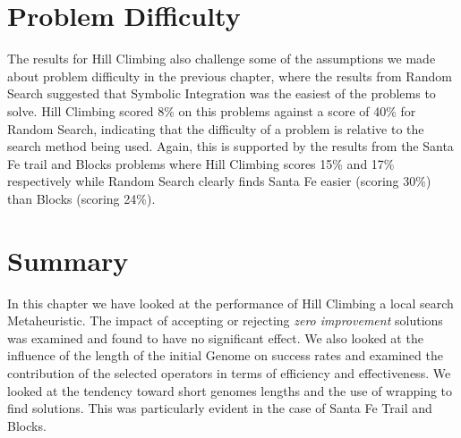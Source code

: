 \section{Problem Difficulty}
The results for Hill Climbing also challenge some of the assumptions we made about problem difficulty in the previous chapter, where the results from Random Search suggested that Symbolic Integration was the easiest of the problems to solve. Hill Climbing scored 8\% on this problems against a score of 40\% for Random Search, indicating that the difficulty of a problem is relative to the search method being used. Again, this is supported by the results from the Santa Fe trail and Blocks problems where Hill Climbing scores 15\% and 17\% respectively while Random Search clearly finds Santa Fe easier (scoring 30\%) than Blocks (scoring 24\%).


\section{Summary}
In this chapter we have looked at the performance of Hill Climbing a local search Metaheuristic. The impact of accepting or rejecting \emph{zero improvement} solutions was examined and found to have no significant effect. We also looked at the influence of the length of the initial Genome on success rates and examined the contribution of the selected operators in terms of efficiency and effectiveness. 
We looked at the tendency toward short genomes lengths and the use of wrapping to find solutions. This was particularly evident in the case of Santa Fe Trail and Blocks.

